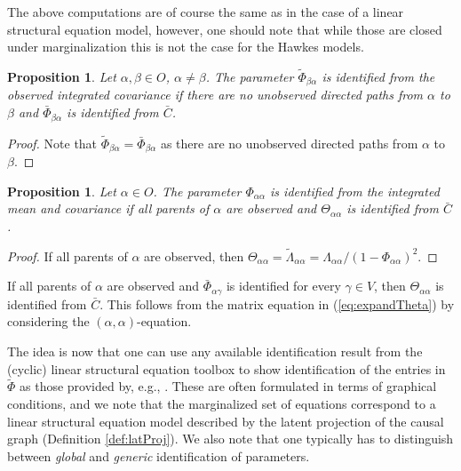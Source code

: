 \documentclass[accepted]{uai2021} %
\newtheorem{prop}[thm]{Proposition}
\begin{document}
The above computations are of course the same as in the case of a linear 
structural equation model, however, one should note that while those are closed 
under marginalization this is not the case for the Hawkes models.

\begin{prop}
	Let $\alpha,\beta \in O$, $\alpha\neq \beta$. The parameter 
	$\tilde{\Phi}_{\beta\alpha}$ is 
	identified 
	from the observed integrated covariance if there 
	are no unobserved directed paths from 
	$\alpha$ to $\beta$ and $\bar{\Phi}_{\beta\alpha}$ is identified from 
	$\bar{C}$.
\end{prop}

\begin{proof}
	Note that $\tilde{\Phi}_{\beta\alpha} = \bar{\Phi}_{\beta\alpha}$ as there 
	are no 
	unobserved directed paths from $\alpha$ to $\beta$.
\end{proof}

\begin{prop}
	Let $\alpha\in O$. The parameter $\Phi_{\alpha\alpha}$ is identified from 
	the 
	integrated mean and covariance if all 
	parents of $\alpha$ are observed and $\Theta_{\alpha\alpha}$ is identified 
	from 
	$\bar{C}$.
\end{prop}

\begin{proof}
	If all parents of $\alpha$ are observed, then $\Theta_{\alpha\alpha} = 
	\tilde{\Lambda}_{\alpha\alpha} = \Lambda_{\alpha\alpha}/(1 - 
	\Phi_{\alpha\alpha})^2$.
\end{proof}

If all parents of $\alpha$ are observed and $\bar{\Phi}_{\alpha\gamma}$ is 
identified for 
 every 
 $\gamma\in V$, then $\Theta_{\alpha\alpha}$ is identified from $\bar{C}$.
This follows from the matrix equation in (\ref{eq:expandTheta}) by considering 
the $(\alpha,\alpha)$-equation.

The idea is now 
that one can use any available identification result from the (cyclic) linear 
structural equation toolbox to show identification of the entries in 
$\tilde{\Phi}$ as those provided by, e.g., \cite{foygelHalftrek2012, 
chenNIPS2016, 
weihs2018}. 
These are often 
formulated in terms of graphical 
conditions, and we note that the 
marginalized set of equations correspond to a linear structural 
equation model described by the latent projection of the causal graph 
(Definition \ref{def:latProj}). We also note that one typically has to 
distinguish between \emph{global} and \emph{generic} identification of 
parameters.
\end{document}

